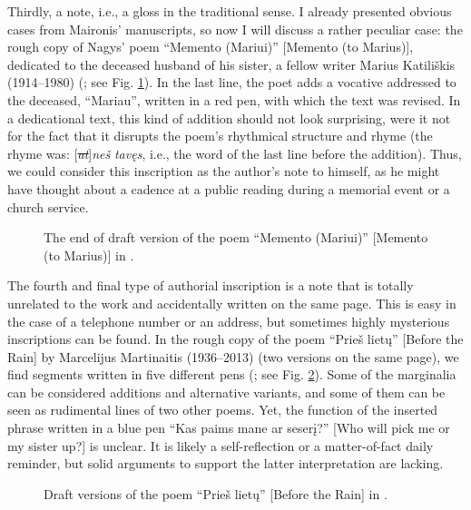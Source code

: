 \begin{paper}
Thirdly, a note, i.e., a gloss in the traditional sense. I already presented obvious cases from Maironis' manuscripts, so now I will discuss a rather
peculiar case: the rough copy of Nagys' poem ``Memento (Mariui)''
{[}Memento (to Marius){]}, dedicated to the deceased husband of his
sister, a fellow writer Marius Katiliškis (1914--1980) (\citealt[20v]{nagys_memento_1980};
see Fig. \ref{fig:subacius11}). In the last line, the poet adds a vocative addressed to
the deceased, ``Mariau'', written in a red pen, with which the text was
revised. In a dedicational text, this kind of addition should not look
surprising, were it not for the fact that it disrupts the poem's
rhythmical structure and rhyme (the rhyme was:
{[}\emph{\sout{at}}{]}\emph{neš} \textbar{} \emph{tavęs}, i.e., the word
of the last line before the addition). Thus, we could consider this
inscription as the author's note to himself, as he might have thought
about a cadence at a public reading during a memorial event or a church
service.

\begin{figure}[!p]
    \centering
    \caption{The end of draft version of the poem ``Memento (Mariui)'' {[}Memento (to Marius){]} in \citealt[20v]{nagys_memento_1980}.}
    \label{fig:subacius11}
\end{figure}

The fourth and final type of authorial inscription is a note that is totally unrelated to the work and accidentally
written on the same page. This is easy in the case of a telephone number
or an address, but sometimes highly mysterious inscriptions can be
found. In the rough copy of the poem ``Prieš lietų'' {[}Before the
Rain{]} by Marcelijus Martinaitis (1936--2013) (two versions on the same
page), we find segments written in five different pens (\citealt{martinaitis_pries_1967}; see Fig. \ref{fig:subacius12}). Some of the marginalia can be considered additions
and alternative variants, and some of them can be seen as rudimental
lines of two other poems. Yet, the function of the inserted phrase
written in a blue pen ``Kas paims mane ar seserį?'' {[}Who will pick me
or my sister up?{]} is unclear. It is likely a self-reflection or a
matter-of-fact daily reminder, but solid arguments to support the latter
interpretation are lacking.

\begin{figure}[H]
    \centering
    \caption{Draft versions of the poem ``Prieš lietų'' {[}Before the
Rain{]} in \cite[17r]{martinaitis_pries_1967}.}
    \label{fig:subacius12}
\end{figure}


\end{paper}
